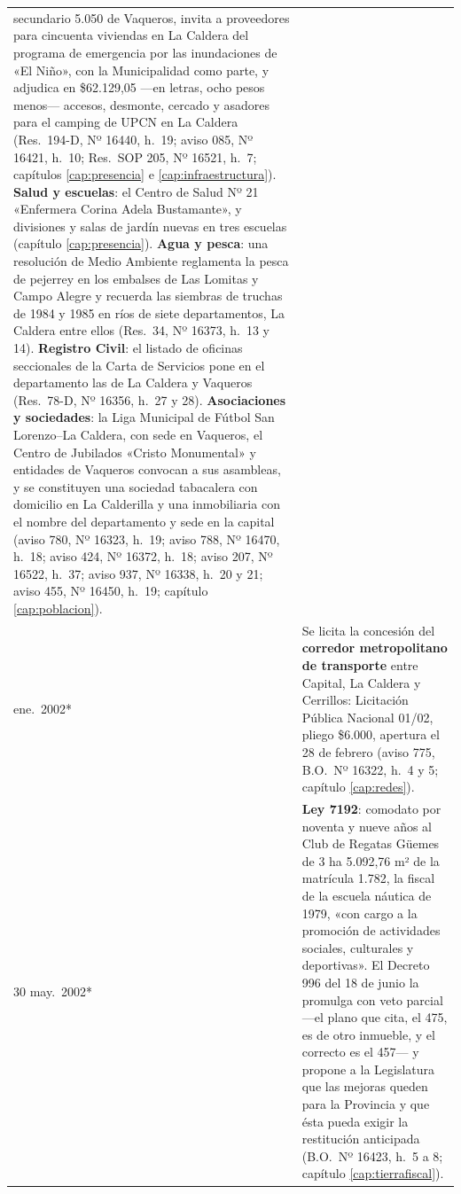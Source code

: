 \begin{longtable}{@{}p{2.7cm}p{10.3cm}@{}}
secundario 5.050 de Vaqueros, invita a proveedores para cincuenta viviendas en La Caldera del programa de emergencia por las inundaciones de «El Niño», con la Municipalidad como parte, y adjudica en \$62.129,05 ---en letras, ocho pesos menos--- accesos, desmonte, cercado y asadores para el camping de UPCN en La Caldera (Res.\ 194-D, Nº 16440, h.\ 19; aviso 085, Nº 16421, h.\ 10; Res.\ SOP 205, Nº 16521, h.\ 7; capítulos \ref{cap:presencia} e \ref{cap:infraestructura}). \textbf{Salud y escuelas}: el Centro de Salud Nº 21 «Enfermera Corina Adela Bustamante», y divisiones y salas de jardín nuevas en tres escuelas (capítulo \ref{cap:presencia}). \textbf{Agua y pesca}: una resolución de Medio Ambiente reglamenta la pesca de pejerrey en los embalses de Las Lomitas y Campo Alegre y recuerda las siembras de truchas de 1984 y 1985 en ríos de siete departamentos, La Caldera entre ellos (Res.\ 34, Nº 16373, h.\ 13 y 14). \textbf{Registro Civil}: el listado de oficinas seccionales de la Carta de Servicios pone en el departamento las de La Caldera y Vaqueros (Res.\ 78-D, Nº 16356, h.\ 27 y 28). \textbf{Asociaciones y sociedades}: la Liga Municipal de Fútbol San Lorenzo--La Caldera, con sede en Vaqueros, el Centro de Jubilados «Cristo Monumental» y entidades de Vaqueros convocan a sus asambleas, y se constituyen una sociedad tabacalera con domicilio en La Calderilla y una inmobiliaria con el nombre del departamento y sede en la capital (aviso 780, Nº 16323, h.\ 19; aviso 788, Nº 16470, h.\ 18; aviso 424, Nº 16372, h.\ 18; aviso 207, Nº 16522, h.\ 37; aviso 937, Nº 16338, h.\ 20 y 21; aviso 455, Nº 16450, h.\ 19; capítulo \ref{cap:poblacion}). \\
ene.\ 2002* & Se licita la concesión del \textbf{corredor metropolitano de transporte} entre Capital, La Caldera y Cerrillos: Licitación Pública Nacional 01/02, pliego \$6.000, apertura el 28 de febrero (aviso 775, B.O.\ Nº 16322, h.\ 4 y 5; capítulo \ref{cap:redes}). \\
30 may.\ 2002* & \textbf{Ley 7192}: comodato por noventa y nueve años al Club de Regatas Güemes de 3 ha 5.092,76 m² de la matrícula 1.782, la fiscal de la escuela náutica de 1979, «con cargo a la promoción de actividades sociales, culturales y deportivas». El Decreto 996 del 18 de junio la promulga con veto parcial ---el plano que cita, el 475, es de otro inmueble, y el correcto es el 457--- y propone a la Legislatura que las mejoras queden para la Provincia y que ésta pueda exigir la restitución anticipada (B.O.\ Nº 16423, h.\ 5 a 8; capítulo \ref{cap:tierrafiscal}). \\

\end{longtable}
